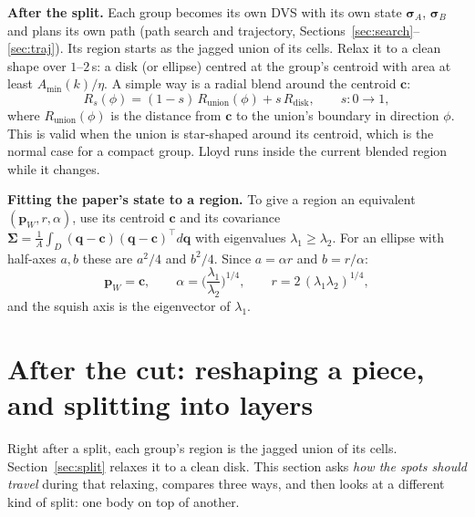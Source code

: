 \documentclass[11pt,a4paper]{article}
\newcommand{\vect}[1]{\mathbf{#1}}
\newcommand{\pW}{\vect{p}_W}
\newcommand{\T}{^{\top}}
\begin{document}
\textbf{After the split.} Each group becomes its own DVS with its own state $\bm\sigma_A$, $\bm\sigma_B$ and plans its own
path (path search and trajectory, Sections~\ref{sec:search}--\ref{sec:traj}). Its region starts as the jagged union of
its cells. Relax it to a clean shape over $1$--$2$\,s: a disk (or ellipse) centred at the group's centroid with area at
least $A_{\min}(k)/\eta$. A simple way is a radial blend around the centroid $\vect{c}$:
\[
R_s(\phi)=(1-s)\,R_{\text{union}}(\phi)+s\,R_{\text{disk}},\qquad s:0\to1,
\]
where $R_{\text{union}}(\phi)$ is the distance from $\vect{c}$ to the union's boundary in direction $\phi$. This is valid
when the union is star-shaped around its centroid, which is the normal case for a compact group. Lloyd runs inside the
current blended region while it changes.

\textbf{Fitting the paper's state to a region.} To give a region an equivalent $(\pW,r,\alpha)$, use its centroid
$\vect{c}$ and its covariance $\vect{\Sigma}=\frac1A\int_D(\vect{q}-\vect{c})(\vect{q}-\vect{c})\T d\vect{q}$ with eigenvalues
$\lambda_1\ge\lambda_2$. For an ellipse with half-axes $a,b$ these are $a^2/4$ and $b^2/4$. Since $a=\alpha r$ and
$b=r/\alpha$:
\[
\pW=\vect{c},\qquad \alpha=\Big(\frac{\lambda_1}{\lambda_2}\Big)^{1/4},\qquad r=2\,(\lambda_1\lambda_2)^{1/4},
\]
and the squish axis is the eigenvector of $\lambda_1$.

\section{After the cut: reshaping a piece, and splitting into layers}\label{sec:reshape}


Right after a split, each group's region is the jagged union of its cells. Section~\ref{sec:split} relaxes it to a
clean disk. This section asks \emph{how the spots should travel} during that relaxing, compares three ways, and then
looks at a different kind of split: one body on top of another.
\end{document}
